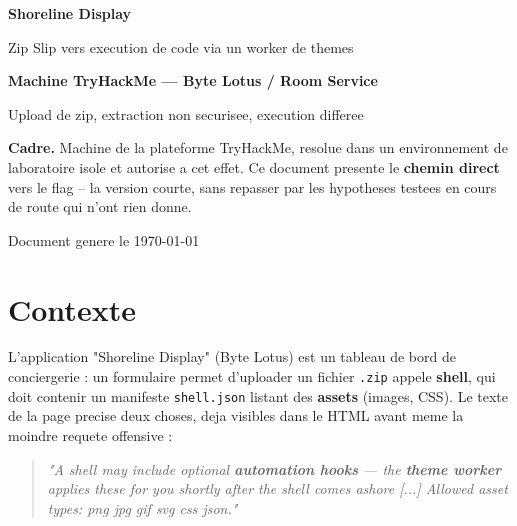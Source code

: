 \documentclass[11pt,a4paper]{article}
\begin{document}
\begin{titlepage}
\centering
\vspace*{2.2cm}
{\Huge\bfseries\color{navy} Shoreline Display\par}
\vspace{0.4cm}
{\Large\color{gold} Zip Slip vers execution de code via un worker de themes\par}
\vspace{1.6cm}

{\large\bfseries\color{navy} Machine TryHackMe --- Byte Lotus / Room Service\par}
{\large Upload de zip, extraction non securisee, execution differee\par}

\vspace{2.4cm}
\begin{tcolorbox}[colback=boxok, colframe=boxokb, width=0.82\textwidth, arc=3pt, boxrule=1pt]
\textbf{Cadre.} Machine de la plateforme TryHackMe, resolue dans un
environnement de laboratoire isole et autorise a cet effet. Ce document
presente le \textbf{chemin direct} vers le flag -- la version courte,
sans repasser par les hypotheses testees en cours de route qui n'ont
rien donne.
\end{tcolorbox}

\vfill
{\small\color{codegray} Document genere le \today\par}
\end{titlepage}

\tableofcontents
\newpage

\section{Contexte}

L'application "Shoreline Display" (Byte Lotus) est un tableau de bord
de conciergerie : un formulaire permet d'uploader un fichier
\texttt{.zip} appele \textbf{shell}, qui doit contenir un manifeste
\texttt{shell.json} listant des \textbf{assets} (images, CSS). Le texte
de la page precise deux choses, deja visibles dans le HTML avant meme
la moindre requete offensive :

\begin{quotation}
\noindent\itshape
"A shell may include optional \textbf{automation hooks} --- the
\textbf{theme worker} applies these for you shortly after the shell
comes ashore [...] Allowed asset types: png jpg gif svg css json."
\end{quotation}
\end{document}
